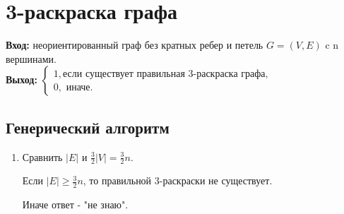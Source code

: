 \documentclass[a4paper, 12pt]{article}
\theoremstyle{definition}
\theoremstyle{remark}
\begin{document}
\section*{3-раскраска графа}
\textbf{Вход:} неориентированный граф без кратных ребер и петель $G = (V, E)$ c n вершинами.
\\
\textbf{Выход:} $\begin{cases}
    1,\text{если существует правильная 3-раскраска графа,}\\
    0,\text{ иначе.}
\end{cases}$
\subsection*{Генерический алгоритм}
\begin{enumerate}
    \item Сравнить $|E|$ и $\frac32|V|=\frac32 n$.

    Если $|E| \ge \frac32 n$, то правильной 3-раскраски не существует.
    
    Иначе ответ - "не знаю".
\end{enumerate}
\end{document}
